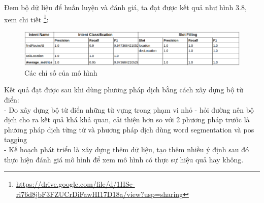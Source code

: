 	Đem bộ dữ liệu để huấn luyện và đánh giá, ta đạt được kết quả như hình 3.8, xem chi tiết \footnote{\url{https://drive.google.com/file/d/1HSe-ri76d8jbF3FZUCrDiFawHI17D18a/view?usp=sharing}}: 


   \begin{figure}[htp]
              \centering
              \includegraphics[width=15cm]{images/metrics-tudien.png} 
              \caption{Các chỉ số của mô hình}
              \label{fig:sodohethongchiduong}

          \end{figure} 
         Kết quả đạt được sau khi dùng phương pháp dịch bằng cách xây dựng bộ từ điển:
         \\
         - Do xây dựng bộ từ điển những từ vựng trong phạm vi nhỏ - hỏi đường nên bộ dịch cho ra kết quả khá khả quan, cải thiện hơn so với 2 phương pháp trước là phương pháp dịch từng từ và phương pháp dịch dùng word segmentation và pos tagging
         \\
        - Kế hoạch phát triển là xây dựng thêm dữ liệu, tạo thêm nhiều ý định sau đó thực hiện đánh giá mô hình để xem mô hình có thực sự hiệu quả hay không.
     
